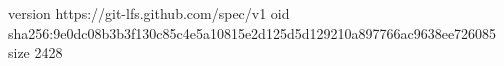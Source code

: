 version https://git-lfs.github.com/spec/v1
oid sha256:9e0dc08b3b3f130c85c4e5a10815e2d125d5d129210a897766ac9638ee726085
size 2428

